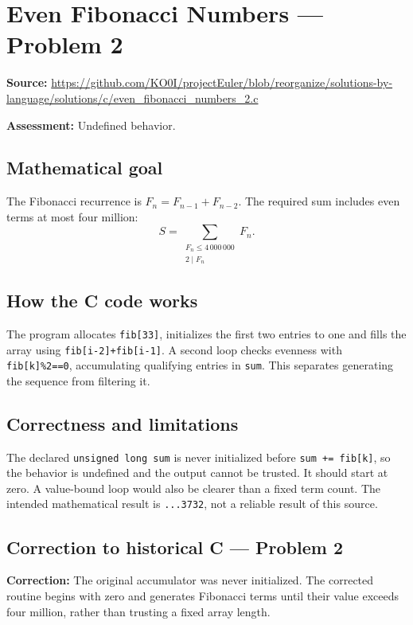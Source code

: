 \section{Even Fibonacci Numbers --- Problem 2}
\label{prob:2}
\noindent\textbf{Source:} \url{https://github.com/KO0I/projectEuler/blob/reorganize/solutions-by-language/solutions/c/even_fibonacci_numbers_2.c}

\noindent\textbf{Assessment:} Undefined behavior.

\subsection*{Mathematical goal}
The Fibonacci recurrence is \(F_n=F_{n-1}+F_{n-2}\). The required sum includes even terms at most four million:
\[
S=\sum_{\substack{F_n\leq4\,000\,000\\2\mid F_n}}F_n.
\]

\subsection*{How the C code works}
The program allocates \verb|fib[33]|, initializes the first two entries to one and fills the array using \verb|fib[i-2]+fib[i-1]|. A second loop checks evenness with \verb|fib[k]%2==0|, accumulating qualifying entries in \verb|sum|. This separates generating the sequence from filtering it.

\subsection*{Correctness and limitations}
The declared \verb|unsigned long sum| is never initialized before \verb|sum += fib[k]|, so the behavior is undefined and the output cannot be trusted. It should start at zero. A value-bound loop would also be clearer than a fixed term count. The intended mathematical result is \texttt{...3732}, not a reliable result of this source.


\subsection*{Correction to historical C --- Problem 2}
{\color{red}\textbf{Correction:} The original accumulator was never initialized. The corrected routine begins with zero and generates Fibonacci terms until their value exceeds four million, rather than trusting a fixed array length.}
